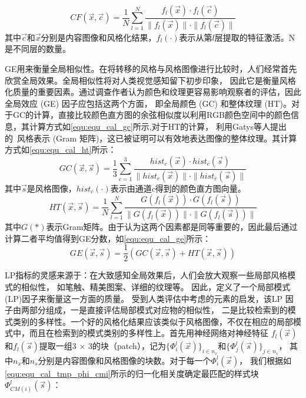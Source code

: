 \begin{equation}
    \label{equ:equ_cal_cf}
    CF(\vec{x},\vec{c})=\frac1N\sum_{l=1}^N\frac{f_l(\vec{x})\cdot f_l(\vec{c})}{\parallel f_l(\vec{x})\parallel\cdot\parallel f_l(\vec{c})\parallel}
\end{equation}
其中$\vec{c}$和$\vec{x}$分别是内容图像和风格化结果，\(f_l(\cdot)\)表示从第$l$层提取的特征激活。N是不同层的数量。
\par GE用来衡量全局相似性。在将转移的风格与风格图像进行比较时，人们经常首先欣赏全局效果。全局相似性将对人类视觉感知留下初步印象，
因此它是衡量风格化质量的重要因素。通过调查作者认为颜色和纹理更容易影响观察者的评估，因此全局效应 (GE) 因子应包括这两个方面，
即全局颜色 (GC) 和整体纹理 (HT)。对于GC的计算，直接比较颜色直方图的余弦相似度以利用RGB颜色空间中的颜色信息，其计算方式如\autoref{equ:equ_cal_gc}所示,对于HT的计算，
利用Gatys等人提出的~\cite{gatys2016image,gatys2017controlling}风格表示 (Gram 矩阵)，这已被证明可以有效地表达图像的整体纹理。其计算方式如\autoref{equ:equ_cal_ht}所示：
\begin{equation}
    \label{equ:equ_cal_gc}
    GC(\vec{x},\vec{s})=\frac13\sum_{c=1}^3\frac{hist_c(\vec{x})\cdot hist_c(\vec{s})}{\parallel hist_c(\vec{x})\parallel\cdot\parallel hist_c(\vec{s})\parallel}
\end{equation}
其中$\vec{s}$是风格图像，\(hist_c(\cdot)\)表示由通道$c$得到的颜色直方图向量。
\begin{equation}
    \label{equ:equ_cal_ht}
    HT(\vec{x},\vec{s})=\frac1N\sum_{l=1}^N\frac{G(f_l(\vec{x}))\cdot G(f_l(\vec{s}))}{\parallel G(f_l(\vec{x}))\parallel\cdot\parallel G(f_l(\vec{s}))\parallel}
\end{equation}
其中$G(*)$表示Gram矩阵。由于认为这两个因素都是同等重要的，因此最后通过计算二者平均值得到GE分数，如\autoref{equ:equ_cal_ge}所示：
\begin{equation}
    \label{equ:equ_cal_ge}
    GE(\vec{x},\vec{s})=\frac12(GC(\vec{x},\vec{s})+HT(\vec{x},\vec{s}))
\end{equation}
\par LP指标的灵感来源于：在大致感知全局效果后，人们会放大观察一些局部风格模式的相似性，
如笔触、精美图案、详细的纹理等。
因此，定义了一个局部模式(LP)因子来衡量这一方面的质量。
受到人类评估中考虑的元素的启发，该LP 因子由两部分组成，一是直接评估局部模式对应物的相似性，
二是比较检索到的模式类别的多样性。一个好的风格化结果应该类似于风格图像，不仅在相应的局部模式中，而且在检索到的模式类别的多样性上。首先用神经网络对神经特征
\(f_l(\vec{x})\)和\(f_l(\vec{s})\)提取一组3 × 3的块（patch），记为\(\{\Phi_i^l(\vec{x})\}_{i\in n_x}\)和\(\{\Phi_j^l(\vec{s})\}_{j\in n_s}\)，
其中$n_x$和$n_s$分别是内容图像和风格图像的块数。对于每一个\(\Phi_i^l(\vec{x})\)，
我们根据如\autoref{equ:equ_cal_tmp_phi_cmi}所示的归一化相关度确定最匹配的样式块\(\Phi_{CM(i)}^l(\vec{s})\)：

